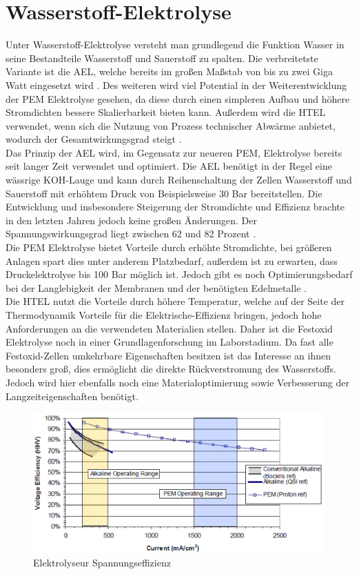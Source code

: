 \section{Wasserstoff-Elektrolyse}
\label{sec:Elektrolyse}
Unter Wasserstoff-Elektrolyse versteht man grundlegend die Funktion Wasser in seine Bestandteile Wasserstoff und Sauerstoff zu spalten. Die verbreitetste Variante ist die \gls{AEL}, welche bereits im großen Maßstab von bis zu zwei Giga Watt eingesetzt wird \cite{2GWely}. Des weiteren wird viel Potential in der Weiterentwicklung der \gls{PEM} Elektrolyse gesehen, da diese durch einen simpleren Aufbau und höhere Stromdichten bessere Skalierbarkeit bieten kann. Außerdem wird die \gls{HTEL} verwendet, wenn sich die Nutzung von Prozess technischer Abwärme anbietet, wodurch der Gesamtwirkungsgrad steigt \cite{Elektrolyse}.\\
Das Prinzip der \gls{AEL} wird, im Gegensatz zur neueren \gls{PEM}, Elektrolyse bereits seit langer Zeit verwendet und optimiert. Die \gls{AEL} benötigt in der Regel eine wässrige KOH-Lauge und kann durch Reihenschaltung der Zellen Wasserstoff und Sauerstoff mit erhöhtem Druck von Beispielsweise 30 Bar bereitstellen. Die Entwicklung und insbesondere Steigerung der Stromdichte und Effizienz brachte in den letzten Jahren jedoch keine großen Änderungen. Der Spannungswirkungsgrad liegt zwischen 62 und 82 Prozent \cite{NOWH2}.\\
Die \gls{PEM} Elektrolyse bietet Vorteile durch erhöhte Stromdichte, bei größeren Anlagen spart dies unter anderem Platzbedarf, außerdem ist zu erwarten, dass Druckelektrolyse bis 100 Bar möglich ist. Jedoch gibt es noch Optimierungsbedarf bei der  Langlebigkeit der Membranen und der benötigten Edelmetalle \cite{NOWH2}. \\
Die \gls{HTEL} nutzt die Vorteile durch höhere Temperatur, welche auf der Seite der Thermodynamik Vorteile für die Elektrische-Effizienz bringen, jedoch hohe Anforderungen an die verwendeten Materialien stellen. Daher ist die Festoxid Elektrolyse noch in einer Grundlagenforschung im Laborstadium. Da fast alle Festoxid-Zellen umkehrbare Eigenschaften besitzen ist das Interesse an ihnen besonders groß, dies ermöglicht die direkte Rückverstromung des Wasserstoffs. Jedoch wird hier ebenfalls noch eine Materialoptimierung sowie Verbesserung der Langzeiteigenschaften benötigt.\\

\begin{figure}
	\centering
	\includegraphics[width=0.7\linewidth]{content/Grafiken/Ely-Efficiency}
	\caption[Elektrolyseur Spannungseffizienz]{Elektrolyseur Spannungseffizienz \cite{NOWH2}}
	\label{fig:ely-efficiency}
\end{figure}


